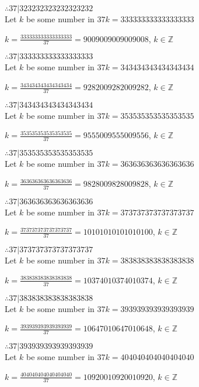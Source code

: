 \documentclass{article}
\begin{document}
$ \therefore  37|323232323232323232 $ \\

Let $k$ be some number in $37k = 333333333333333333$

$k = \frac{333333333333333333}{37} = 9009009009009008$, $k \in \mathbb{Z}$

$ \therefore  37|333333333333333333 $ \\

Let $k$ be some number in $37k = 343434343434343434$

$k = \frac{343434343434343434}{37} = 9282009282009282$, $k \in \mathbb{Z}$

$ \therefore  37|343434343434343434 $ \\

Let $k$ be some number in $37k = 353535353535353535$

$k = \frac{353535353535353535}{37} = 9555009555009556$, $k \in \mathbb{Z}$

$ \therefore  37|353535353535353535 $ \\

Let $k$ be some number in $37k = 363636363636363636$

$k = \frac{363636363636363636}{37} = 9828009828009828$, $k \in \mathbb{Z}$

$ \therefore  37|363636363636363636 $ \\

Let $k$ be some number in $37k = 373737373737373737$

$k = \frac{373737373737373737}{37} = 10101010101010100$, $k \in \mathbb{Z}$

$ \therefore  37|373737373737373737 $ \\

Let $k$ be some number in $37k = 383838383838383838$

$k = \frac{383838383838383838}{37} = 10374010374010374$, $k \in \mathbb{Z}$

$ \therefore  37|383838383838383838 $ \\

Let $k$ be some number in $37k = 393939393939393939$

$k = \frac{393939393939393939}{37} = 10647010647010648$, $k \in \mathbb{Z}$

$ \therefore  37|393939393939393939 $ \\

Let $k$ be some number in $37k = 404040404040404040$

$k = \frac{404040404040404040}{37} = 10920010920010920$, $k \in \mathbb{Z}$
\end{document}
